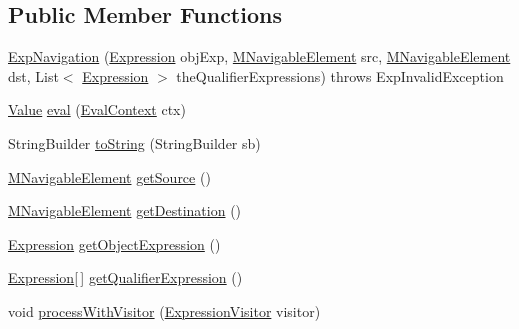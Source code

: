 \subsection*{Public Member Functions}
\begin{DoxyCompactItemize}
\item 
\hyperlink{classorg_1_1tzi_1_1use_1_1uml_1_1ocl_1_1expr_1_1_exp_navigation_a487d9903cb6a0d5dccab2878ac721697}{Exp\-Navigation} (\hyperlink{classorg_1_1tzi_1_1use_1_1uml_1_1ocl_1_1expr_1_1_expression}{Expression} obj\-Exp, \hyperlink{interfaceorg_1_1tzi_1_1use_1_1uml_1_1mm_1_1_m_navigable_element}{M\-Navigable\-Element} src, \hyperlink{interfaceorg_1_1tzi_1_1use_1_1uml_1_1mm_1_1_m_navigable_element}{M\-Navigable\-Element} dst, List$<$ \hyperlink{classorg_1_1tzi_1_1use_1_1uml_1_1ocl_1_1expr_1_1_expression}{Expression} $>$ the\-Qualifier\-Expressions)  throws Exp\-Invalid\-Exception     
\item 
\hyperlink{classorg_1_1tzi_1_1use_1_1uml_1_1ocl_1_1value_1_1_value}{Value} \hyperlink{classorg_1_1tzi_1_1use_1_1uml_1_1ocl_1_1expr_1_1_exp_navigation_a8bcaf7eda196e98a7d3804a9606cc51b}{eval} (\hyperlink{classorg_1_1tzi_1_1use_1_1uml_1_1ocl_1_1expr_1_1_eval_context}{Eval\-Context} ctx)
\item 
String\-Builder \hyperlink{classorg_1_1tzi_1_1use_1_1uml_1_1ocl_1_1expr_1_1_exp_navigation_ae10fb81c7c285be31979078cd9c1e4e0}{to\-String} (String\-Builder sb)
\item 
\hyperlink{interfaceorg_1_1tzi_1_1use_1_1uml_1_1mm_1_1_m_navigable_element}{M\-Navigable\-Element} \hyperlink{classorg_1_1tzi_1_1use_1_1uml_1_1ocl_1_1expr_1_1_exp_navigation_abcf207245c1270d658a450a04798c989}{get\-Source} ()
\item 
\hyperlink{interfaceorg_1_1tzi_1_1use_1_1uml_1_1mm_1_1_m_navigable_element}{M\-Navigable\-Element} \hyperlink{classorg_1_1tzi_1_1use_1_1uml_1_1ocl_1_1expr_1_1_exp_navigation_aa56f1a721ecedfd416341384babcf885}{get\-Destination} ()
\item 
\hyperlink{classorg_1_1tzi_1_1use_1_1uml_1_1ocl_1_1expr_1_1_expression}{Expression} \hyperlink{classorg_1_1tzi_1_1use_1_1uml_1_1ocl_1_1expr_1_1_exp_navigation_a89a36317603eecf88130d785e9bf1fb5}{get\-Object\-Expression} ()
\item 
\hyperlink{classorg_1_1tzi_1_1use_1_1uml_1_1ocl_1_1expr_1_1_expression}{Expression}\mbox{[}$\,$\mbox{]} \hyperlink{classorg_1_1tzi_1_1use_1_1uml_1_1ocl_1_1expr_1_1_exp_navigation_acecf4b7b2b2f46026bc97cf3e9e77f3b}{get\-Qualifier\-Expression} ()
\item 
void \hyperlink{classorg_1_1tzi_1_1use_1_1uml_1_1ocl_1_1expr_1_1_exp_navigation_a72019f6b0b9899d3cbafb27ed37ce60b}{process\-With\-Visitor} (\hyperlink{interfaceorg_1_1tzi_1_1use_1_1uml_1_1ocl_1_1expr_1_1_expression_visitor}{Expression\-Visitor} visitor)
\end{DoxyCompactItemize}
